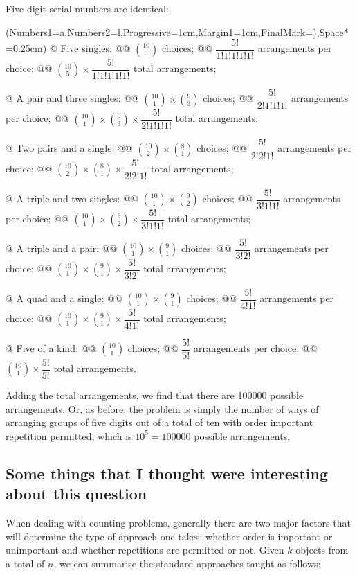 \documentclass[a4paper,11pt]{article}
\begin{document}
\noindent Five digit serial numbers are identical:
\begin{easylist}[enumerate]
	\ListProperties(Numbers1=a,Numbers2=l,Progressive=1cm,Margin1=1cm,FinalMark={)},Space*=0.25cm)
	@ Five singles:
	@@ $\binom{10}{5}$ choices;
	@@ $\dfrac{5!}{1!1!1!1!1!}$ arrangements per choice;
	@@ $\binom{10}{5}\times\dfrac{5!}{1!1!1!1!1!}$ total arrangements;
	
	@ A pair and three singles:
	@@ $\binom{10}{1}\times\binom{9}{3}$ choices;
	@@ $\dfrac{5!}{2!1!1!1!}$ arrangements per choice;
	@@ $\binom{10}{1}\times\binom{9}{3}\times\dfrac{5!}{2!1!1!1!}$ total arrangements;
	
	@ Two pairs and a single:
	@@ $\binom{10}{2}\times\binom{8}{1}$ choices;
	@@ $\dfrac{5!}{2!2!1!}$ arrangements per choice;
	@@ $\binom{10}{2}\times\binom{8}{1}\times\dfrac{5!}{2!2!1!}$ total arrangements;
	
	@ A triple and two singles:
	@@ $\binom{10}{1}\times\binom{9}{2}$ choices;
	@@ $\dfrac{5!}{3!1!1!}$ arrangements per choice;
	@@ $\binom{10}{1}\times\binom{9}{2}\times\dfrac{5!}{3!1!1!}$ total arrangements;
	
	@ A triple and a pair:
	@@ $\binom{10}{1}\times\binom{9}{1}$ choices;
	@@ $\dfrac{5!}{3!2!}$ arrangements per choice;
	@@ $\binom{10}{1}\times\binom{9}{1}\times\dfrac{5!}{3!2!}$ total arrangements;
	
	@ A quad and a single:
	@@ $\binom{10}{1}\times\binom{9}{1}$ choices;
	@@ $\dfrac{5!}{4!1!}$ arrangements per choice;
	@@ $\binom{10}{1}\times\binom{9}{1}\times\dfrac{5!}{4!1!}$ total arrangements;
	
	@ Five of a kind:
	@@ $\binom{10}{1}$ choices;
	@@ $\dfrac{5!}{5!}$ arrangements per choice;
	@@ $\binom{10}{1}\times\dfrac{5!}{5!}$ total arrangements.\\
\end{easylist}

\noindent Adding the total arrangements, we find that there are 100000 possible arrangements. Or, as before, the problem is simply the number of ways of arranging groups of five digits out of a total of ten with order important repetition permitted, which is $10^5=100000$ possible arrangements.

\pagebreak

\subsection*{Some things that I thought were interesting about this question}
When dealing with counting problems, generally there are two major factors that will determine the type of approach one takes: whether order is important or unimportant and whether repetitions are permitted or not. Given $k$ objects from a total of $n$, we can summarise the standard approaches taught as follows:
\end{document}
